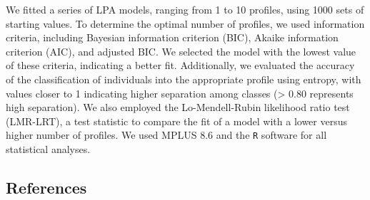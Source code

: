 \documentclass[
]{apa7}
\begin{document}
We fitted a series of LPA models, ranging from 1 to 10 profiles, using
1000 sets of starting values. To determine the optimal number of
profiles, we used information criteria, including Bayesian information
criterion (BIC), Akaike information criterion (AIC), and adjusted BIC.
We selected the model with the lowest value of these criteria,
indicating a better fit. Additionally, we evaluated the accuracy of the
classification of individuals into the appropriate profile using
entropy, with values closer to 1 indicating higher separation among
classes (\textgreater{} 0.80 represents high separation). We also
employed the Lo-Mendell-Rubin likelihood ratio test (LMR-LRT), a test
statistic to compare the fit of a model with a lower versus higher
number of profiles. We used MPLUS 8.6 and the \texttt{R} software for
all statistical analyses.

\hypertarget{references}{%
\subsection*{References}\label{references}}
\end{document}
